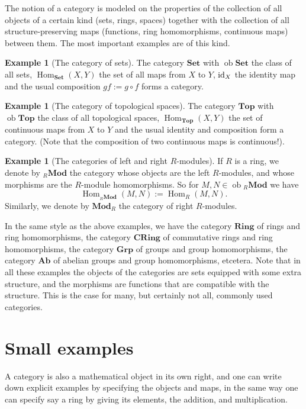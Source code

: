 \documentclass[11pt]{amsbook}
\DeclareMathOperator\Hom{Hom}
\DeclareMathOperator\Mod{{\bf{Mod}}}
\DeclareMathOperator\ob{ob}
\def\id{{\rm id}}
\def\Set{\mathbf{Set}}
\def\Ab{\mathbf{Ab}}
\def\Top{\mathbf{Top}}
\def\Grp{\mathbf{Grp}}
\def\Ring{\mathbf{Ring}}
\def\CRing{\mathbf{CRing}}
\def\Mod{\mathbf{Mod}}
\theoremstyle{plain}
\theoremstyle{definition}
\newtheorem{example}[theorem]{Example}
\begin{document}
The notion of a category is modeled on the properties of the collection of all objects of a certain kind (sets, rings, spaces) together with the collection of all structure-preserving maps (functions, ring homomorphisms, continuous maps) between them. The most important examples are of this kind.

\begin{example}[The category of sets] The category $\Set$ with $\ob \Set$ the class of all sets,  $\Hom_{\Set}(X,Y)$ the set of all maps from $X$ to $Y$, $\id_X$ the identity map and the usual composition $gf:= g \circ f$ forms a category.
\end{example}

\begin{example}[The category of topological spaces] The category $\Top$ with $\ob \Top$ the class of all topological spaces, $\Hom_\Top(X,Y)$ the set of continuous maps from $X$ to $Y$ and the usual identity and composition form a category. (Note that the composition of two continuous maps is continuous!).
\end{example}

\begin{example}[The categories of left and right $R$-modules] If $R$ is a ring, we denote by ${}_R\Mod$ the category whose objects are the left  $R$-modules, and whose morphisms are the $R$-module homomorphisms. So for $M,N \in \ob {}_R\Mod$ we have
\[
	\Hom_{{}_R\Mod}( M, N ) := \Hom_R( M, N ).
\]
Similarly, we denote by $\Mod_R$ the category of right $R$-modules.
\end{example}


In the same style as the above examples, we have the category $\Ring$ of rings and ring homomorphisms, the category $\CRing$ of commutative rings and ring homomorphisms, the category $\Grp$ of groups and group homomorphisms, the category $\Ab$ of abelian groups and group homomorphisms, etcetera. Note that in all these examples the objects of the categories are sets equipped with some extra structure, and the morphisms are  functions that are compatible with the structure.  This is the case for many, but certainly not all, commonly used categories. 


\section{Small examples}\label{sec:small-examples}

A category is also a mathematical object in its own right, and one can write down explicit examples by specifying the objects and maps, in the same way one can specify say a ring by giving its elements, the addition, and multiplication. 
\end{document}
